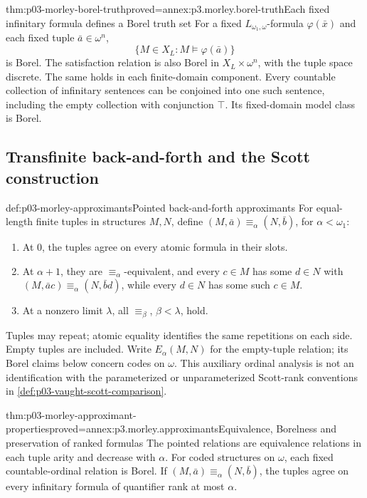 \begin{hblemma}{thm:p03-morley-borel-truth}{proved=annex:p3.morley.borel-truth}{Each fixed infinitary formula defines a Borel truth set}
For a fixed \(L_{\omega_1,\omega}\)-formula
\(\varphi(\bar x)\) and each fixed tuple
\(\bar a\in\omega^n\),
\[
 \{M\in X_L:M\models\varphi(\bar a)\}
\]
is Borel. The satisfaction relation is also Borel in
\(X_L\times\omega^n\), with the tuple space discrete.
The same holds in each finite-domain component.
Every countable collection of infinitary sentences can
be conjoined into one such sentence, including the
empty collection with conjunction \(\top\).
Its fixed-domain model class is Borel.
\end{hblemma}

\subsection{Transfinite back-and-forth and the Scott construction}
\label{sec:p03-morley-scott}

\begin{hbdefinition}{def:p03-morley-approximants}{Pointed back-and-forth approximants}
For equal-length finite tuples in structures \(M,N\), define
\((M,\bar a)\equiv_\alpha(N,\bar b)\), for \(\alpha<\omega_1\):
\begin{enumerate}
\item At \(0\), the tuples agree on every atomic formula
      in their slots.
\item At \(\alpha+1\), they are \(\equiv_\alpha\)-equivalent,
      and every \(c\in M\) has some \(d\in N\) with
      \((M,\bar a c)\equiv_\alpha(N,\bar b d)\),
      while every \(d\in N\) has some such \(c\in M\).
\item At a nonzero limit \(\lambda\), all
      \(\equiv_\beta\), \(\beta<\lambda\), hold.
\end{enumerate}
Tuples may repeat; atomic equality identifies the same
repetitions on each side. Empty tuples are included.
Write \(E_\alpha(M,N)\) for the empty-tuple relation;
its Borel claims below concern codes on \(\omega\).
This auxiliary ordinal analysis is not an identification
with the parameterized or unparameterized Scott-rank
conventions in \cref{def:p03-vaught-scott-comparison}.
\end{hbdefinition}

\begin{hblemma}{thm:p03-morley-approximant-properties}{proved=annex:p3.morley.approximants}{Equivalence, Borelness and preservation of ranked formulas}
The pointed relations are equivalence relations in each
tuple arity and decrease with \(\alpha\).
For coded structures on \(\omega\), each fixed
countable-ordinal relation is Borel.
If \((M,\bar a)\equiv_\alpha(N,\bar b)\), the tuples
agree on every infinitary formula of quantifier rank
at most \(\alpha\).
\end{hblemma}

